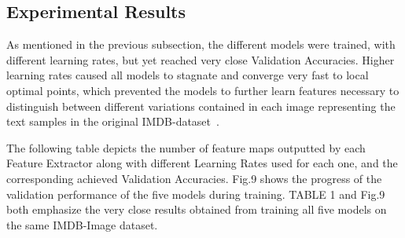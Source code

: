 \documentclass[conference]{IEEEtran}
\begin{document}
\subsection{Experimental Results}
			As mentioned in the previous subsection, the different models were trained,
			with different learning rates, but yet reached very close Validation Accuracies. Higher learning rates caused all models to stagnate and converge very fast to local optimal points, which prevented the models to further learn features necessary to distinguish between different variations contained in each image representing the text samples in the original IMDB-dataset~\cite{imdb}.
			
			The following table depicts the number of feature maps outputted by each Feature Extractor along with different Learning Rates used for each one, and the corresponding achieved Validation Accuracies. Fig.9 shows the progress of the validation performance of the five models during training.
            TABLE 1 and Fig.9 both emphasize the very close results obtained from training all five models on the same IMDB-Image dataset.
        
\end{document}
